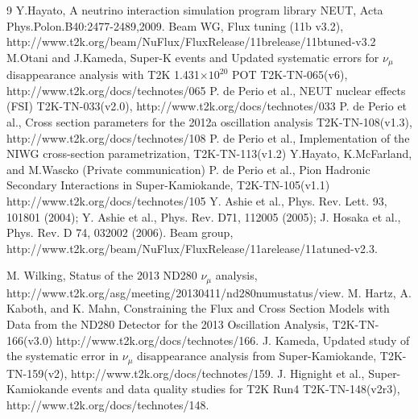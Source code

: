 \begin{thebibliography}{9}
%
%
  Y.Hayato, A neutrino interaction simulation program library NEUT,
  Acta Phys.Polon.B40:2477-2489,2009.
   Beam WG, Flux tuning (11b v3.2), http://www.t2k.org/beam/NuFlux/FluxRelease/11brelease/11btuned-v3.2
   M.Otani and J.Kameda,
   Super-K events and Updated systematic errors for $\nu_\mu$ disappearance analysis with T2K 1.431$\times10^{20}$ POT
   T2K-TN-065(v6),
   http://www.t2k.org/docs/technotes/065
  P. de Perio et al.,
  NEUT nuclear effects (FSI)
  T2K-TN-033(v2.0),
  http://www.t2k.org/docs/technotes/033
  P. de Perio et al.,
  Cross section parameters for the 2012a oscillation analysis
  T2K-TN-108(v1.3),
  http://www.t2k.org/docs/technotes/108
  P. de Perio et al.,
  Implementation of the NIWG cross-section parametrization,
  T2K-TN-113(v1.2) 
  Y.Hayato, K.McFarland, and M.Wascko (Private communication) 
  P. de Perio et al.,
  Pion Hadronic Secondary Interactions in Super-Kamiokande,
  T2K-TN-105(v1.1)
  http://www.t2k.org/docs/technotes/105
  Y. Ashie et al., Phys. Rev. Lett. 93, 101801 (2004);
  Y. Ashie et al., Phys. Rev. D71, 112005 (2005); 
  J. Hosaka et al., Phys. Rev. D 74, 032002 (2006).
  Beam group,
  http://www.t2k.org/beam/NuFlux/FluxRelease/11arelease/11atuned-v2.3.

%
%

  M. Wilking,
  Status of the 2013 ND280 $\nu_{\mu}$ analysis,\\
  http://www.t2k.org/asg/meeting/20130411/nd280numustatus/view.
  M. Hartz, A. Kaboth, and K. Mahn,
  Constraining the Flux and Cross Section Models with Data from the
  ND280 Detector for the 2013 Oscillation Analysis,
  T2K-TN-166(v3.0)
  http://www.t2k.org/docs/technotes/166.
   J. Kameda,
   Updated study of the systematic error in $\nu_{\mu}$ disappearance analysis from Super-Kamiokande,
   T2K-TN-159(v2),
   http://www.t2k.org/docs/technotes/159.
   J. Hignight et al.,
   Super-Kamiokande events and data quality studies for T2K Run4
   T2K-TN-148(v2r3),
   http://www.t2k.org/docs/technotes/148.


\end{thebibliography}
